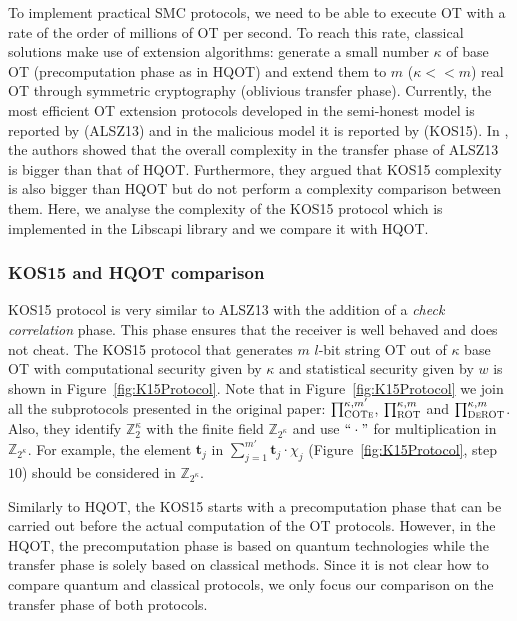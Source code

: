 To implement practical SMC protocols, we need to be able to execute OT with a rate of the order of millions of OT per second. To reach this rate, classical solutions make use of extension algorithms: generate a small number $\kappa$ of base OT (precomputation phase as in HQOT) and extend them to $m$ ($\kappa << m$) real OT through symmetric cryptography \cite{IKNP03} (oblivious transfer phase). Currently, the most efficient OT extension protocols developed in the semi-honest model is reported by \cite{ALSZ13} (ALSZ13) and in the malicious model it is reported by \cite{K15} (KOS15). In \cite{Santos2021}, the authors showed that the overall complexity in the transfer phase of ALSZ13 is bigger than that of HQOT. Furthermore, they argued that KOS15 complexity is also bigger than HQOT but do not perform a complexity comparison between them. Here, we analyse the complexity of the KOS15 protocol which is implemented in the Libscapi library and we compare it with HQOT.

\subsubsection{KOS15 and HQOT comparison}

KOS15 protocol is very similar to ALSZ13 with the addition of a \textit{check correlation} phase. This phase ensures that the receiver is well behaved and does not cheat. The KOS15 protocol that generates $m$ $l$-bit string OT out of $\kappa$ base OT with computational security given by $\kappa$ and statistical security given by $w$ is shown in Figure~\ref{fig:K15Protocol}. Note that in Figure~\ref{fig:K15Protocol} we join all the subprotocols presented in the original paper: $\prod^{\kappa, m'}_{\textsc{COTe}}$, $\prod^{\kappa, m}_{\textsc{ROT}}$ and $\prod^{\kappa, m}_{\textsc{DeROT}}$. Also, they identify $\mathbb{Z}^\kappa_2$ with the finite field $\mathbb{Z}_{2^\kappa}$ and use $``\cdot"$ for multiplication in $\mathbb{Z}_{2^\kappa}$. For example, the element $\boldsymbol{t}_j$ in $\sum_{j=1}^{m'} \boldsymbol{t}_j \cdot \chi_j$ (Figure~\ref{fig:K15Protocol}, step $10$) should be considered in $\mathbb{Z}_{2^\kappa}$.

Similarly to HQOT, the KOS15 starts with a precomputation phase that can be carried out before the actual computation of the OT protocols. However, in the HQOT, the precomputation phase is based on quantum technologies while the transfer phase is solely based on classical methods. Since it is not clear how to compare quantum and classical protocols, we only focus our comparison on the transfer phase of both protocols. 

